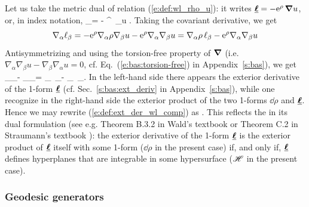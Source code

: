 Let us take the metric dual of relation (\ref{e:def:wl_rho_u}): it writes
$\underline{\bm{\ell}} = - \mathrm{e}^\rho \, \bm{\nabla} u$, or, in index notation,
\be
    \el_\alpha = - ^\rho \, \nabla_\alpha u .
\ee
Taking the covariant derivative, we get
\[
    \nabla_\alpha \ell_\beta = - \mathrm{e}^\rho \nabla_\alpha \rho \nabla_\beta u
                -   \mathrm{e}^\rho  \nabla_\alpha \nabla_\beta u
                 = \nabla_\alpha \rho \, \ell_\beta - \mathrm{e}^\rho  \nabla_\alpha \nabla_\beta u
\]
Antisymmetrizing and using the torsion-free property of $\bm{\nabla}$ (i.e.
$\nabla_\alpha \nabla_\beta u - \nabla_\beta \nabla_\alpha u = 0$, cf.
Eq.~(\ref{e:bas:torsion-free}) in Appendix~\ref{s:bas}), we get
\be \label{e:def:ext_der_wl_comp}
  \nabla_\alpha \el_\beta - \nabla_\beta \el_\alpha =
  \nabla_\alpha \rho \, \el_\beta -  \nabla_\beta \rho \, \el_\alpha  .
\ee
In the left-hand side there appears the exterior derivative of
the 1-form $\underline{\bm{\ell}}$ (cf. Sec.~\ref{s:bas:ext_deriv} in Appendix~\ref{s:bas}),
while one recognize in the right-hand side the exterior product of
the two 1-forms $\dd\rho$ and $\underline{\bm{\ell}}$. Hence we may rewrite (\ref{e:def:ext_der_wl_comp})
as
\be
    \encadre{ \dd \uu{\el} = \dd\rho \wedge \uu{\el} } .
\ee
This reflects the 
in its dual formulation (see e.g.
Theorem B.3.2 in Wald's textbook \cite{Wald84} or Theorem C.2 in
Straumann's textbook \cite{Strau13}): the exterior derivative of
the 1-form $\underline{\bm{\ell}}$ is the exterior product of $\underline{\bm{\ell}}$ itself with some
1-form ($\dd\rho$ in the present case) if, and only if,
$\underline{\bm{\ell}}$ defines hyperplanes that are integrable in some hypersurface ($\mathscr{H}$ in the present case).

\subsubsection{Geodesic generators} \label{s:def:geod_gener}

